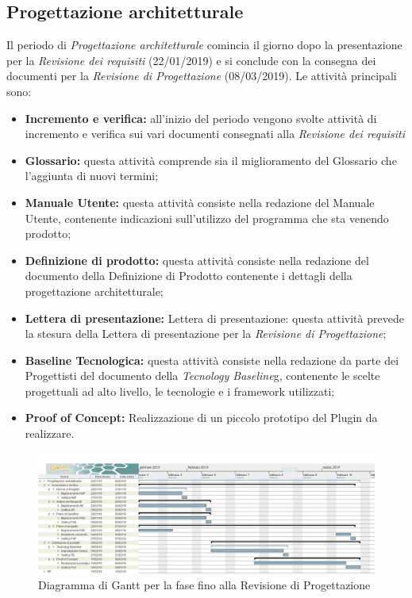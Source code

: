 \newpage
\subsection{Progettazione architetturale}
Il periodo di \textit{Progettazione architetturale} comincia il giorno dopo la presentazione per la \textit{Revisione dei requisiti} (22/01/2019) e si conclude con la consegna dei documenti per la \textit{Revisione di Progettazione} (08/03/2019). Le attività principali sono:
\begin{itemize}
	\item\textbf{Incremento e verifica:} all'inizio del periodo vengono svolte attività di incremento e verifica sui vari documenti consegnati alla \textit{Revisione dei requisiti}
	\item\textbf{Glossario:} questa attività comprende sia il miglioramento del Glossario che l’aggiunta di nuovi termini;
	\item\textbf{Manuale Utente:}  questa attività consiste nella redazione del Manuale Utente, contenente indicazioni sull’utilizzo del programma che sta venendo prodotto;
	\item\textbf{Definizione di prodotto:} questa attività consiste nella redazione del documento della Definizione di Prodotto contenente i dettagli della progettazione architetturale;
	\item\textbf{Lettera di presentazione:} Lettera di presentazione: questa attività prevede la stesura della Lettera di presentazione per la \textit{Revisione di Progettazione};
	\item\textbf{Baseline Tecnologica:} questa attività consiste nella redazione da parte dei Progettisti del documento della \textit{Tecnology Baseline}\ped g, contenente le scelte progettuali ad alto livello, le tecnologie e i framework utilizzati;
	\item \textbf{Proof of Concept:} Realizzazione di un piccolo prototipo del Plugin da realizzare.
\end{itemize}

\begin{figure}[h!]
	\centering
	\includegraphics[width=\textwidth]{Gantt_seconda_fase.jpg}
	\caption{Diagramma di Gantt per la fase fino alla Revisione di Progettazione}
\end{figure}

